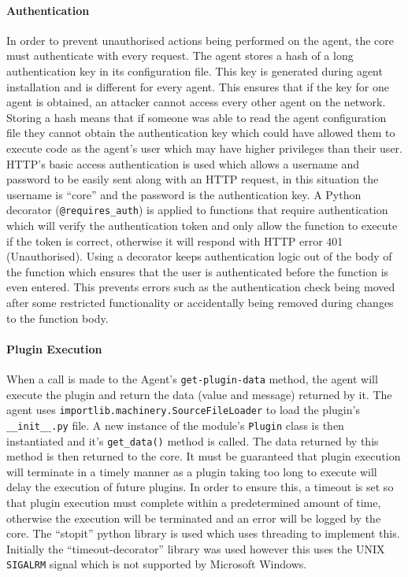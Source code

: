 \documentclass[bsc,deptreport,twoside,parskip,singlespacing,notimes]{infthesis}
\begin{document}
\paragraph*{Authentication}
	In order to prevent unauthorised actions being performed on the agent, the core
	must authenticate with every request.  The agent stores a hash of a long
	authentication key in its configuration file. This key is generated during agent
	installation and is different for every agent. This ensures that if the key for
	one agent is obtained, an attacker cannot access every other agent on the
	network. Storing a hash means that if someone was able to read the agent
	configuration file they cannot obtain the authentication key which could have
	allowed them to execute code as the agent's user which may have higher
	privileges than their user. HTTP's basic access authentication is used which
	allows a username and password to be easily sent along with an HTTP request, in
	this situation the username is ``core'' and the password is the authentication
	key.  A Python decorator (\texttt{@requires\_auth}) is applied to functions
	that require authentication which will verify the authentication token and only
	allow the function to execute if the token is correct, otherwise it will
	respond with HTTP error 401 (Unauthorised). Using a decorator keeps
	authentication logic out of the body of the function which ensures that the
	user is authenticated before the function is even entered.  This prevents
	errors such as the authentication check being moved after some restricted
	functionality or accidentally being removed during changes to the function
	body.
	
\paragraph*{Plugin Execution}
	When a call is made to the Agent's \texttt{get-plugin-data} method, the agent
	will execute the plugin and return the data (value and message) returned by it.
	The agent uses \texttt{importlib.machinery.SourceFileLoader} to load the
	plugin's \texttt{\_\_init\_\_.py} file.  A new instance of the module's
	\texttt{Plugin} class is then instantiated and it's \texttt{get\_data()} method
	is called.  The data returned by this method is then returned to the core.
	It must be guaranteed that plugin execution will terminate in a timely manner
	as a plugin taking too long to execute will delay the execution of future
	plugins.  In order to ensure this, a timeout is set so that plugin execution 
	must complete within a predetermined amount of time, otherwise the execution
	will be terminated and an error will be logged by the core. The ``stopit''
	python library is used which uses threading to implement this.  Initially
	the ``timeout-decorator'' library was used however this uses the UNIX
	\texttt{SIGALRM} signal which is not supported by Microsoft Windows.
\end{document}
